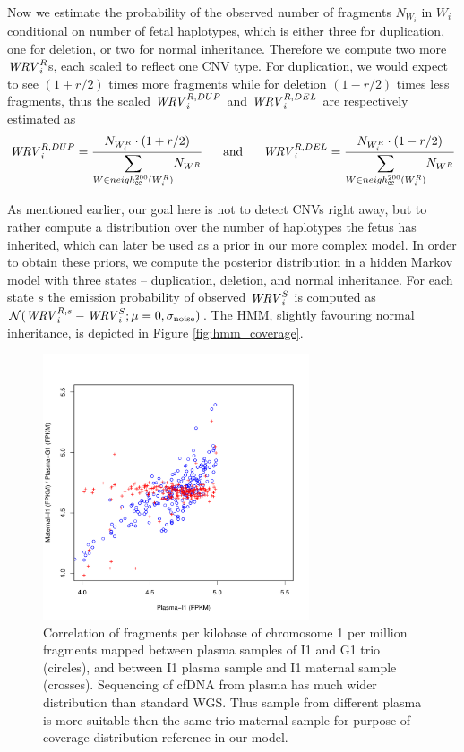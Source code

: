 Now we estimate the probability of the observed number of fragments $N_{W_i}$ in $W_i$ conditional on number of fetal haplotypes, which is either three for duplication, one for deletion, or two for normal inheritance. Therefore we compute two more $\mathit{WRV}_i^R$s, each scaled to reflect one CNV type. For duplication, we would expect to see $(1+r/2)$ times more fragments while for deletion $(1-r/2)$ times less fragments, thus the scaled $\mathit{WRV}_i^{R,DUP}$ and $\mathit{WRV}_i^{R,DEL}$ are respectively estimated as
\begin{align}
\WRV_i^{R,DUP} = \frac{ N_{W_i^R} \cdot (1+r/2) }{ \mathlarger{\sum_{W \in neigh_{\G\C}^{200}(W_i^R)}} N_{W^R} }
\text{ ~~~~and~~~~ }
\WRV_i^{R,DEL} = \frac{ N_{W_i^R} \cdot (1-r/2) }{ \mathlarger{\sum_{W \in neigh_{\G\C}^{200}(W_i^R)}} N_{W^R} }
\end{align}

As mentioned earlier, our goal here is not to detect CNVs right away, but to rather compute a distribution over the number of haplotypes the fetus has inherited, which can later be used as a prior in our more complex model. In order to obtain these priors, we compute the posterior distribution in a hidden Markov model with three states -- duplication, deletion, and normal inheritance. For each state $s$ the emission probability of observed $\mathit{WRV}_i^S$ is computed as $\mathcal{N}(\mathit{WRV}_i^{R,s}-\mathit{WRV}_i^S; \mu=0, \sigma_{\text{noise}})$. The HMM, slightly favouring normal inheritance, is depicted in Figure \ref{fig:hmm_coverage}.

\begin{figure}[h]
\vspace{-20pt}
\center\includegraphics[width = 0.7\textwidth]{figures/fpkm}
\vspace{-12pt}
\caption{Correlation of fragments per kilobase of chromosome 1 per million fragments mapped between plasma samples of I1 and G1 trio (circles), and between I1 plasma sample and I1 maternal sample (crosses). Sequencing of cfDNA from plasma has much wider distribution than standard WGS. Thus sample from different plasma is more suitable then the same trio maternal sample for purpose of coverage distribution reference in our model.}\label{fig:fpkm}
\end{figure}

